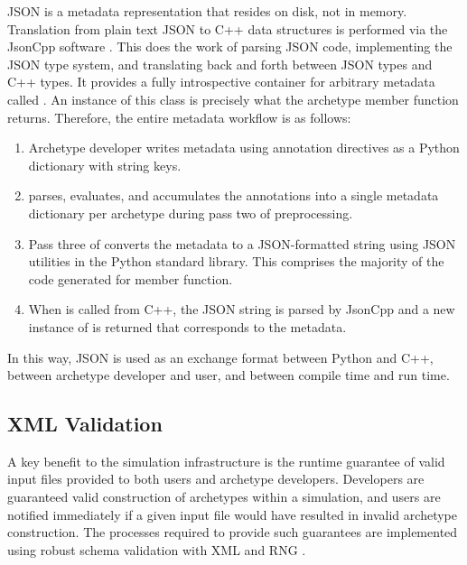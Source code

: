 \gls{JSON} is a metadata representation that resides on disk, 
not in memory. Translation from plain text \gls{JSON} to C++ data structures is 
performed via the JsonCpp software \cite{eltuhamy2014native}. This does the work 
of parsing \gls{JSON} code, implementing the \gls{JSON} type system, and translating back and
forth between \gls{JSON} types and C++ types. It provides a fully 
introspective 
container for arbitrary metadata called . An instance of this 
class is precisely what the  archetype member function returns.
Therefore, the entire metadata workflow is as follows:
\begin{enumerate}
    \item Archetype developer writes metadata using annotation directives as a
          Python dictionary with string keys.
    \item \cycpp parses, evaluates, and accumulates the annotations into a single 
          metadata dictionary per archetype during pass two of preprocessing.
    \item Pass three of \cycpp converts the metadata to a \gls{JSON}-formatted 
          string using 
          \gls{JSON} utilities in the Python standard library. This comprises
          the majority of the 
          code generated for  member
          function.
    \item When  is called from C++, the \gls{JSON} string is parsed 
          by JsonCpp and a new instance of  is returned that
          corresponds to the metadata.
\end{enumerate}
In this way, \gls{JSON} is used as an exchange format between Python and C++, between 
archetype developer and user, and between compile time and run time.

\subsection{XML Validation}

A key benefit to the \Cyclus simulation infrastructure is the runtime
guarantee
of valid input files provided to both users and archetype developers. Developers
are guaranteed valid construction of archetypes within a simulation, and users
are notified immediately if a given input file would have resulted in invalid
archetype construction. The processes required to provide such guarantees are
implemented using robust schema validation with \gls{XML} and
\gls{RNG} \cite{clark2001relax}.


